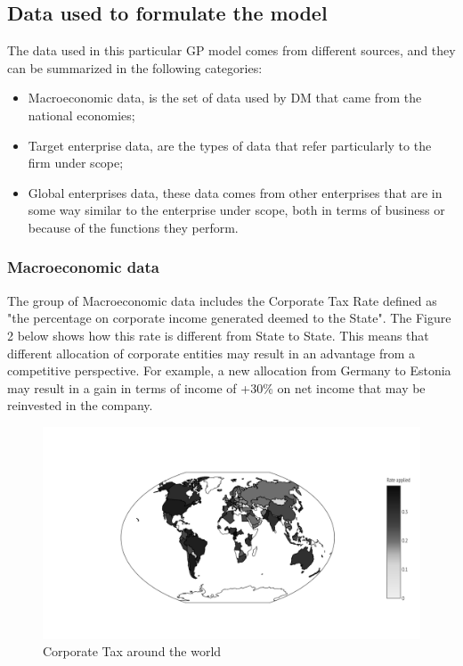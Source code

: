\begin{doublespace}
\subsection{Data used to formulate the model}
The data used in this particular GP model comes from different sources, and they can be summarized in the following categories:
\begin{itemize}
    \item Macroeconomic data, is the set of data used by DM that came from the national economies;
    \item Target enterprise data, are the types of data that refer particularly to the firm under scope;
    \item Global enterprises data, these data comes from other enterprises that are in some way similar to the enterprise under scope, both in terms of business or because of the functions they perform.
\end{itemize}

\subsubsection{Macroeconomic data}
The group of Macroeconomic data includes the Corporate Tax Rate defined as "the percentage on corporate income generated deemed to the State". The Figure 2 below shows how this rate is different from State to State. This means that different allocation of corporate entities may result in an advantage from a competitive perspective. For example, a new allocation from Germany to Estonia may result in a gain in terms of income of +30\% on net income that may be reinvested in the company.
\begin{figure}
\centering
  \centering
  \includegraphics[width=1\linewidth]{Images/CTworld.png}
  \caption{Corporate Tax around the world}
  \label{fig:test1}
\end{figure}


\end{doublespace}
